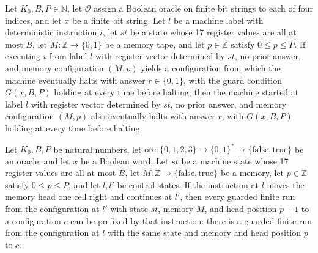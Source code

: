 \begin{lemma}
\label{Complexity.LogProg.ExpBFS.stepH_of}
\leanok
{}
Let $K_0,B,P\in\mathbb{N}$, let $\mathcal O$ assign a Boolean oracle on finite bit
strings to each of four indices, and let $x$ be a finite bit string. Let $l$ be a
machine label with deterministic instruction $i$, let $st$ be a state whose 17 register
values are all at most $B$, let $M\colon\mathbb{Z}\to\{0,1\}$ be a memory tape, and let
$p\in\mathbb{Z}$ satisfy $0\le p\le P$. If executing $i$ from label $l$ with register
vector determined by $st$, no prior answer, and memory configuration $(M,p)$ yields a
configuration from which the machine eventually halts with answer $r\in\{0,1\}$, with
the guard condition $G(x,B,P)$ holding at every time before halting, then the machine
started at label $l$ with register vector determined by $st$, no prior answer, and
memory configuration $(M,p)$ also eventually halts with answer $r$, with $G(x,B,P)$
holding at every time before halting.
\end{lemma}

\begin{lemma}
\label{Complexity.LogProg.ExpBFS.mright_of}
\leanok
{}
Let $K_0,B,P$ be natural numbers, let
$\mathrm{orc}:\{0,1,2,3\}\to\{0,1\}^*\to\{\mathrm{false},\mathrm{true}\}$ be an oracle,
and let $x$ be a Boolean word. Let $st$ be a machine state whose 17 register values are
all at most $B$, let $M:\mathbb Z\to\{\mathrm{false},\mathrm{true}\}$ be a memory, let
$p\in\mathbb Z$ satisfy $0\le p\le P$, and let $l,l'$ be control states. If the
instruction at $l$ moves the memory head one cell right and continues at $l'$, then
every guarded finite run from the configuration at $l'$ with state $st$, memory $M$, and
head position $p+1$ to a configuration $c$ can be prefixed by that instruction: there is
a guarded finite run from the configuration at $l$ with the same state and memory and
head position $p$ to $c$.
\end{lemma}

